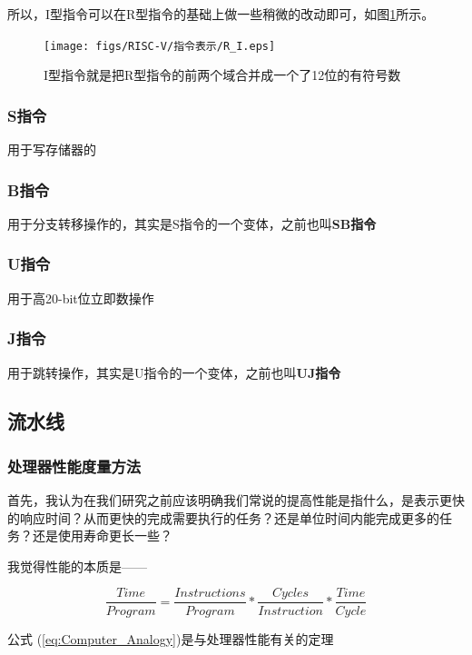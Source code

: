 所以，I型指令可以在R型指令的基础上做一些稍微的改动即可，如图\ref{fig:R_I}所示。

\begin{figure}[htbp]
  \centering %
  \texttt{[image: figs/RISC-V/指令表示/R\_I.eps]}
  \caption{I型指令就是把R型指令的前两个域合并成一个了12位的有符号数}
  \label{fig:R_I} %
\end{figure}



\subsubsection{S指令}
用于写存储器的

\subsubsection{B指令}
用于分支转移操作的，其实是S指令的一个变体，之前也叫\textbf{SB指令}

\subsubsection{U指令}
用于高20-bit位立即数操作

\subsubsection{J指令}
用于跳转操作，其实是U指令的一个变体，之前也叫\textbf{UJ指令}


\subsection{流水线}
\subsubsection{处理器性能度量方法}
首先，我认为在我们研究之前应该明确我们常说的提高性能是指什么，是表示更快的响应时间？从而更快的完成需要执行的任务？还是单位时间内能完成更多的任务？还是使用寿命更长一些？

我觉得性能的本质是——

\begin{equation}\label{eq:Computer_Analogy}
    \frac{ Time }{ Program } = \frac{ Instructions }{ Program } * \frac{ Cycles }{ Instruction } * \frac{ Time }{ Cycle }
\end{equation}

公式 (\ref{eq:Computer_Analogy})是与处理器性能有关的定理

